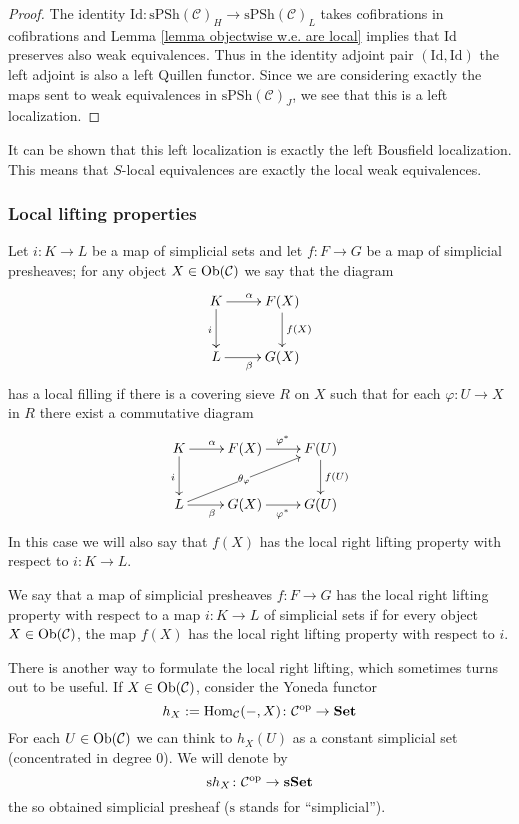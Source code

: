 \begin{refsection}
\begin{proof}
The identity $\mathrm{Id} \colon \mathrm{sPSh}(\mathcal C)_H \to \mathrm{sPSh}(\mathcal C)_L$ takes cofibrations in cofibrations and Lemma \ref{lemma objectwise w.e. are local} implies that $\mathrm{Id}$ preserves also weak equivalences. Thus in the identity adjoint pair $(\mathrm{Id}, \mathrm{Id})$ the left adjoint is also a left Quillen functor. Since we are considering exactly the maps sent to weak equivalences in $\mathrm{sPSh}(\mathcal C)_J$, we see that this is a left localization. 
\end{proof}

\begin{rmk}
It can be shown that this left localization is exactly the left Bousfield localization. This means that $S$-local equivalences are exactly the local weak equivalences.
\end{rmk}

\subsubsection{Local lifting properties}

\begin{defin}
Let $i \colon K \to L$ be a map of simplicial sets and let $f \colon F \to G$ be a map of simplicial presheaves; for any object $X \in \mathrm{Ob}(\mathcal C)$ we say that the diagram
\[
\xymatrix{ K \ar[d]_i \ar[r]^\alpha & F(X) \ar[d]^{f(X)} \\ L \ar[r]_\beta & G(X) }
\]
has a local filling if there is a covering sieve $R$ on $X$ such that for each $\varphi \colon U \to X$ in $R$ there exist a commutative diagram
\[
\xymatrix{
K \ar[d]_i \ar[r]^\alpha & F(X) \ar[r]^{\varphi^*} & F(U) \ar[d]^{f(U)} \\ L \ar[urr]|-{\theta_\varphi} \ar[r]_\beta & G(X) \ar[r]_{\varphi^*} & G(U)
}
\]
In this case we will also say that $f(X)$ has the local right lifting property with respect to $i \colon K \to L$.
\end{defin}

\begin{defin} \label{def local RLP}
We say that a map of simplicial presheaves $f \colon F \to G$ has the local right lifting property with respect to a map $i \colon K \to L$ of simplicial sets if for every object $X \in \mathrm{Ob}(\mathcal C)$, the map $f(X)$ has the local right lifting property with respect to $i$.
\end{defin}

There is another way to formulate the local right lifting, which sometimes turns out to be useful. If $X \in \mathrm{Ob}(\mathcal C)$, consider the Yoneda functor
\[
h_X := \mathrm{Hom}_{\mathcal C}(-,X) \colon \mathcal C^{\mathrm{op}} \to \mathbf{Set}
\]
For each $U \in \mathrm{Ob}(\mathcal C)$ we can think to $h_X(U)$ as a constant simplicial set (concentrated in degree $0$). We will denote by
\[
\mathrm sh_X \colon \mathcal C^{\mathrm{op}} \to \mathbf{sSet}
\]
the so obtained simplicial presheaf ($\mathrm s$ stands for ``simplicial'').


\end{refsection}
